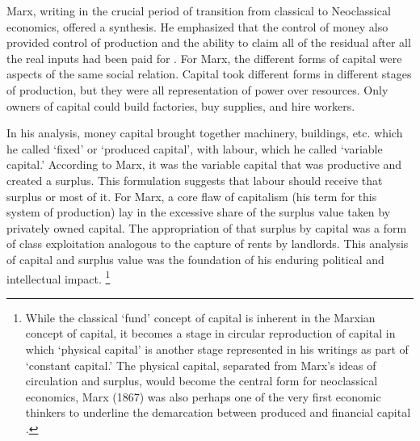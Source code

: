 Marx, writing in the crucial period of transition from classical to Neoclassical economics, offered a synthesis. 
He emphasized that the control of money also provided control of production and the ability to claim all of the residual after all the real inputs had been paid for \cite{royEvolutionConceptCapital2009}. 
For Marx, the different forms of capital were aspects of the same social relation. 
Capital took different forms in different stages of production, but they were all representation of power over resources. 
Only owners of capital could build factories, buy supplies, and hire workers. 

In his analysis, money capital brought together machinery, buildings, etc. which he called `fixed' or `produced capital', with labour, which he called `variable capital.' According to Marx, it was the variable capital that was productive and created a surplus. This formulation suggests that labour should receive that surplus or most of it. For Marx, a core flaw of capitalism (his term for this system of production) lay in the excessive share of the surplus value taken by privately owned capital. The appropriation of that surplus by capital was a form of class exploitation analogous to the capture of rents by 
landlords. This analysis of capital and surplus value was the foundation of his enduring political and intellectual impact. \footnote{While the classical `fund' concept of capital is inherent in the Marxian concept of capital, it becomes a stage in circular reproduction of capital in which  `physical capital'  is another stage represented in his writings as part of `constant capital.' The physical capital, separated from Marx's ideas of circulation and surplus,  would become the  central form for neoclassical economics, %
  Marx (1867) was also perhaps one of the very first economic thinkers to underline the demarcation between produced and financial capital \cite{royEvolutionConceptCapital2009}.}




